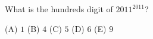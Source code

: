 What is the hundreds digit of $2011^{2011}$?

(A) $1$ \qquad (B) $4$ \qquad (C) $5$ \qquad (D) $6$ \qquad (E) $9$
